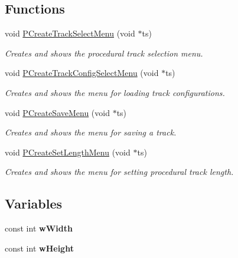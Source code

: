 \subsection*{Functions}
\begin{DoxyCompactItemize}
\item 
void \hyperlink{namespaceprocedural_a61b999a269935de7c516f3528adb0199}{P\-Create\-Track\-Select\-Menu} (void $\ast$ts)
\begin{DoxyCompactList}\small\item\em Creates and shows the procedural track selection menu. \end{DoxyCompactList}\item 
void \hyperlink{namespaceprocedural_ad5b6ebb74fedd8eb556ea9b53c14f6c2}{P\-Create\-Track\-Config\-Select\-Menu} (void $\ast$ts)
\begin{DoxyCompactList}\small\item\em Creates and shows the menu for loading track configurations. \end{DoxyCompactList}\item 
void \hyperlink{namespaceprocedural_a77137168566de60ad9dfb6d3233b7db3}{P\-Create\-Save\-Menu} (void $\ast$ts)
\begin{DoxyCompactList}\small\item\em Creates and shows the menu for saving a track. \end{DoxyCompactList}\item 
void \hyperlink{namespaceprocedural_a89a565f5d7e70063113cc14c2443e3d7}{P\-Create\-Set\-Length\-Menu} (void $\ast$ts)
\begin{DoxyCompactList}\small\item\em Creates and shows the menu for setting procedural track length. \end{DoxyCompactList}\end{DoxyCompactItemize}
\subsection*{Variables}
\begin{DoxyCompactItemize}
\item 
\hypertarget{namespaceprocedural_ae36f494b512a49ae8c0cb04475ca6f0c}{const int {\bfseries w\-Width}}\label{namespaceprocedural_ae36f494b512a49ae8c0cb04475ca6f0c}

\item 
\hypertarget{namespaceprocedural_a922408b7a7ce4ddd572d3d3d78c0e2ae}{const int {\bfseries w\-Height}}\label{namespaceprocedural_a922408b7a7ce4ddd572d3d3d78c0e2ae}

\end{DoxyCompactItemize}



